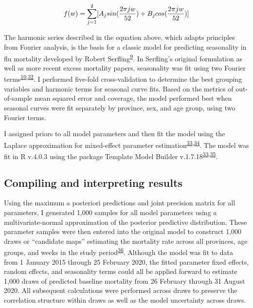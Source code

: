 \documentclass[
]{article}
\begin{document}
\[f(w) = \large\sum_{j=1}^{2}[A_{j}sin(\frac{2\pi j w}{52}) + B_{j}cos(\frac{2\pi j w}{52})]\]

The harmonic series described in the equation above, which adapts principles from Fourier analysis, is the basis for a classic model for predicting seasonality in flu mortality developed by Robert Serfling\textsuperscript{\protect\hyperlink{ref-Serfling1963}{9}}⁠. In Serfling's original formulation as well as more recent excess mortality papers, seasonality was fit using two Fourier terms\textsuperscript{\protect\hyperlink{ref-Weinberger2020a}{10},\protect\hyperlink{ref-Woolf2020}{32}}⁠. I performed five-fold cross-validation to determine the best grouping variables and harmonic terms for seasonal curve fits. Based on the metrics of out-of-sample mean squared error and coverage, the model performed best when seasonal curves were fit separately by province, sex, and age group, using two Fourier terms.

I assigned priors to all model parameters and then fit the model using the Laplace approximation for mixed-effect parameter estimation\textsuperscript{\protect\hyperlink{ref-Kristensen2016}{33},\protect\hyperlink{ref-Thorson2016}{34}}⁠. The model was fit in R v.4.0.3 using the package Template Model Builder v.1.7.18\textsuperscript{\protect\hyperlink{ref-Kristensen2016}{33},\protect\hyperlink{ref-RCoreTeam2018}{35}}.

\hypertarget{compiling-and-interpreting-results}{%
\subsection{Compiling and interpreting results}\label{compiling-and-interpreting-results}}

Using the maximum a posteriori predictions and joint precision matrix for all parameters, I generated 1,000 samples for all model parameters using a multivariate-normal approximation of the posterior predictive distribution. These parameter samples were then entered into the original model to construct 1,000 draws or ``candidate maps'' estimating the mortality rate across all provinces, age groups, and weeks in the study period\textsuperscript{\protect\hyperlink{ref-Patil2011}{36}}⁠. Although the model was fit to data from 1 January 2015 through 25 February 2020, the fitted parameter fixed effects, random effects, and seasonality terms could all be applied forward to estimate 1,000 draws of predicted baseline mortality from 26 February through 31 August 2020. All subsequent calculations were performed across draws to preserve the correlation structure within draws as well as the model uncertainty across draws.
\end{document}
